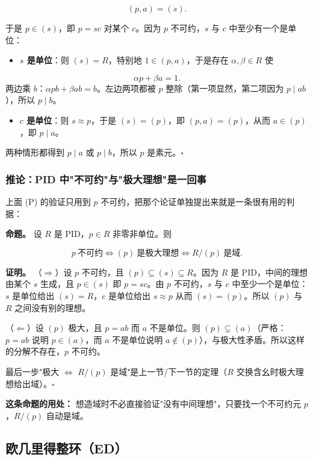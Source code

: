 \[
(p,a)=(s).
\]

于是 $p\in(s)$，即 $p=sc$ 对某个 $c$。因为 $p$ 不可约，$s$ 与 $c$ 中至少有一个是单位：

\begin{itemize}
\item \textbf{$s$ 是单位}：则 $(s)=R$，特别地 $1\in(p,a)$，于是存在 $\alpha,\beta\in R$ 使
\end{itemize}

\[
  \alpha p+\beta a=1 .
\]
  两边乘 $b$：$\alpha pb+\beta ab=b$。左边两项都被 $p$ 整除（第一项显然，第二项因为 $p\mid ab$），所以 $p\mid b$。
\begin{itemize}
\item \textbf{$c$ 是单位}：则 $s\approx p$，于是 $(s)=(p)$，即 $(p,a)=(p)$，从而 $a\in(p)$，即 $p\mid a$。
\end{itemize}


两种情形都得到 $p\mid a$ 或 $p\mid b$，所以 $p$ 是素元。$\square$

\subsubsection{推论：PID 中"不可约"与"极大理想"是一回事}


上面 (P) 的验证只用到 $p$ 不可约，把那个论证单独提出来就是一条很有用的判据：

\textbf{命题。} 设 $R$ 是 PID，$p\in R$ 非零非单位。则

\[
p\ \text{不可约}\iff(p)\ \text{是极大理想}\iff R/(p)\ \text{是域}.
\]

\textbf{证明。} （$\Rightarrow$）设 $p$ 不可约，且 $(p)\subseteq(s)\subseteq R$。因为 $R$ 是 PID，中间的理想由某个 $s$ 生成，且 $p\in(s)$ 即 $p=sc$。由 $p$ 不可约，$s$ 与 $c$ 中至少一个是单位：$s$ 是单位给出 $(s)=R$，$c$ 是单位给出 $s\approx p$ 从而 $(s)=(p)$。所以 $(p)$ 与 $R$ 之间没有别的理想。

（$\Leftarrow$）设 $(p)$ 极大，且 $p=ab$ 而 $a$ 不是单位。则 $(p)\subsetneq(a)$（严格：$p=ab$ 说明 $p\in(a)$，而 $a$ 不是单位说明 $a\notin(p)$），与极大性矛盾。所以这样的分解不存在，$p$ 不可约。

最后一步"极大 $\iff$ $R/(p)$ 是域"是上一节/下一节的定理（$R$ 交换含幺时极大理想给出域）。$\square$

\textbf{这条命题的用处：} 想造域时不必直接验证"没有中间理想"，只要找一个不可约元 $p$，$R/(p)$ 自动是域。

\subsection{欧几里得整环（ED）}


